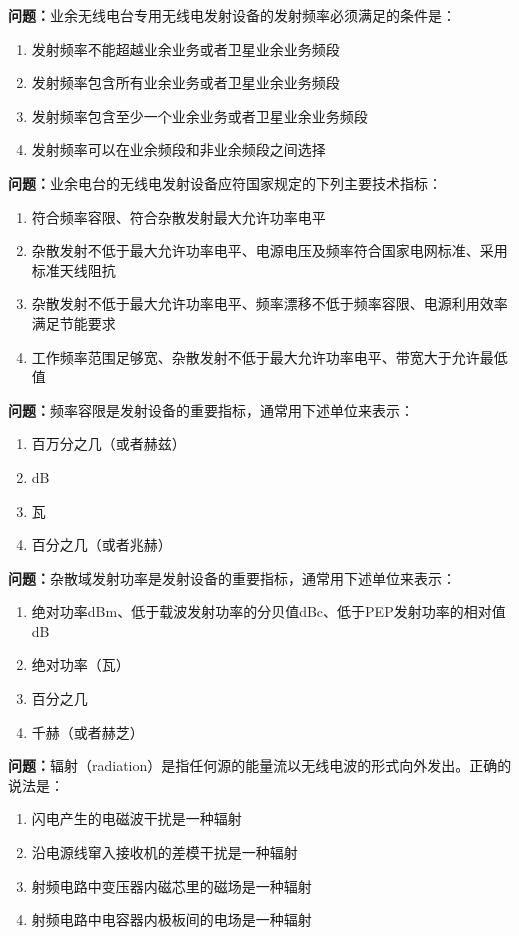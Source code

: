 \textbf{问题：}业余无线电台专用无线电发射设备的发射频率必须满足的条件是：
\begin{enumerate}[label=\Alph*), leftmargin=3em]
	\item 发射频率不能超越业余业务或者卫星业余业务频段
	\item 发射频率包含所有业余业务或者卫星业余业务频段
	\item 发射频率包含至少一个业余业务或者卫星业余业务频段
	\item 发射频率可以在业余频段和非业余频段之间选择
\end{enumerate}

\textbf{问题：}业余电台的无线电发射设备应符国家规定的下列主要技术指标：
\begin{enumerate}[label=\Alph*), leftmargin=3em]
	\item 符合频率容限、符合杂散发射最大允许功率电平
	\item 杂散发射不低于最大允许功率电平、电源电压及频率符合国家电网标准、采用标准天线阻抗
	\item 杂散发射不低于最大允许功率电平、频率漂移不低于频率容限、电源利用效率满足节能要求
	\item 工作频率范围足够宽、杂散发射不低于最大允许功率电平、带宽大于允许最低值
\end{enumerate}

\textbf{问题：}频率容限是发射设备的重要指标，通常用下述单位来表示：
\begin{enumerate}[label=\Alph*), leftmargin=3em]
	\item 百万分之几（或者赫兹）
	\item dB
	\item 瓦
	\item 百分之几（或者兆赫）
\end{enumerate}

\textbf{问题：}杂散域发射功率是发射设备的重要指标，通常用下述单位来表示：
\begin{enumerate}[label=\Alph*), leftmargin=3em]
	\item 绝对功率dBm、低于载波发射功率的分贝值dBc、低于PEP发射功率的相对值dB
	\item 绝对功率（瓦）
	\item 百分之几
	\item 千赫（或者赫芝）
\end{enumerate}

\textbf{问题：}辐射（radiation）是指任何源的能量流以无线电波的形式向外发出。正确的说法是：
\begin{enumerate}[label=\Alph*), leftmargin=3em]
	\item 闪电产生的电磁波干扰是一种辐射
	\item 沿电源线窜入接收机的差模干扰是一种辐射
	\item 射频电路中变压器内磁芯里的磁场是一种辐射
	\item 射频电路中电容器内极板间的电场是一种辐射
\end{enumerate}

